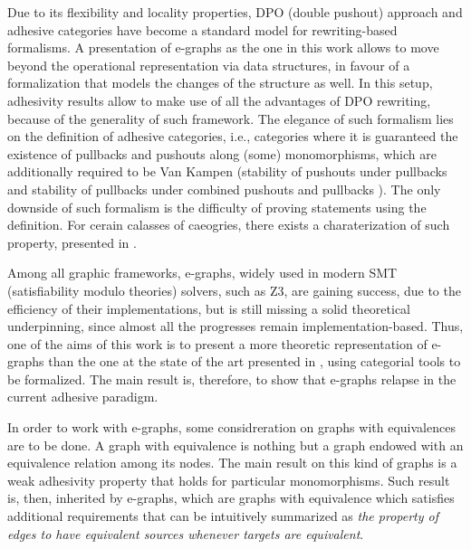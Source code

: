 Due to its flexibility and locality properties, DPO (double pushout) approach and adhesive categories have become a standard model for rewriting-based formalisms. 
A presentation of e-graphs as the one in this work allows to move beyond the operational representation via data structures, in favour of a formalization that models the changes of the structure as well.
In this setup, adhesivity results allow to make use of all the advantages of DPO rewriting, because of the generality of such framework.
The elegance of such formalism lies on the definition of adhesive categories, i.e., categories where it is guaranteed the existence of pullbacks and pushouts along (some) monomorphisms, which are additionally required to be Van Kampen (stability of pushouts under pullbacks and stability of pullbacks under combined pushouts and pullbacks \cite{Ehrig_Golas}).
The only downside of such formalism is the difficulty of proving statements using the definition. 
For cerain calasses of caeogries, there exists a charaterization of such property, presented in \cite{castelnovo2022newcriterionmathcalmmathcalnadhesivity}.

Among all graphic frameworks, e-graphs, widely used in modern SMT (satisfiability modulo theories) solvers, such as Z3, are gaining success, due to the efficiency of their implementations, but is still missing a solid theoretical underpinning, since almost all the progresses remain implementation-based.
Thus, one of the aims of this work is to present a more theoretic representation of e-graphs than the one at the state of the art presented in \cite{egg}, using categorial tools to be formalized.
The main result is, therefore, to show that e-graphs relapse in the current adhesive paradigm.

In order to work with e-graphs, some considreration on graphs with equivalences are to be done. 
A graph with equivalence is nothing but a graph endowed with an equivalence relation among its nodes. 
The main result on this kind of graphs is a weak adhesivity property that holds for particular monomorphisms. 
Such result is, then, inherited by e-graphs, which are graphs with equivalence which satisfies additional requirements that can be intuitively summarized as \textit{the property of edges to have equivalent sources whenever targets are equivalent}.

